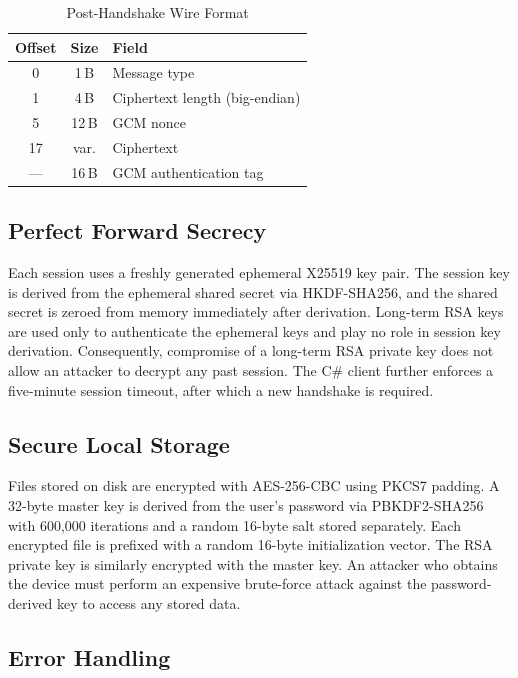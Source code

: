 \documentclass[sigconf,nonacm]{acmart}
\begin{document}
\begin{table}
  \caption{Post-Handshake Wire Format}
  \label{tab:wireformat}
  \begin{tabular}{ccp{3.5cm}}
    \toprule
    Offset & Size & Field \\
    \midrule
    0 & 1\,B & Message type \\
    1 & 4\,B & Ciphertext length (big-endian) \\
    5 & 12\,B & GCM nonce \\
    17 & var. & Ciphertext \\
    --- & 16\,B & GCM authentication tag \\
    \bottomrule
  \end{tabular}
\end{table}

\subsection{Perfect Forward Secrecy}

Each session uses a freshly generated ephemeral X25519 key pair.
The session key is derived from the ephemeral shared secret via HKDF-SHA256, and the shared secret is zeroed from memory immediately after derivation.
Long-term RSA keys are used only to authenticate the ephemeral keys and play no role in session key derivation.
Consequently, compromise of a long-term RSA private key does not allow an attacker to decrypt any past session.
The C\# client further enforces a five-minute session timeout, after which a new handshake is required.

\subsection{Secure Local Storage}

Files stored on disk are encrypted with AES-256-CBC using PKCS7 padding.
A 32-byte master key is derived from the user's password via PBKDF2-SHA256~\cite{vanoorschot2021} with 600{,}000 iterations and a random 16-byte salt stored separately.
Each encrypted file is prefixed with a random 16-byte initialization vector.
The RSA private key is similarly encrypted with the master key.
An attacker who obtains the device must perform an expensive brute-force attack against the password-derived key to access any stored data.

\subsection{Error Handling}
\end{document}
